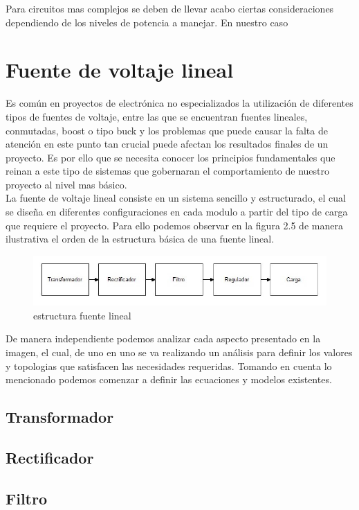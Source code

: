 Para circuitos mas complejos se deben de llevar acabo ciertas consideraciones dependiendo de los niveles de potencia a manejar. En nuestro caso 


\newpage
\section{Fuente de voltaje lineal}
Es común en proyectos de electrónica no especializados la utilización de diferentes tipos de fuentes de voltaje, entre las que se encuentran fuentes lineales, conmutadas, boost o tipo buck y los problemas que puede causar la falta de atención en este punto tan crucial puede afectan los resultados finales de un proyecto. Es por ello que se necesita conocer los principios fundamentales que reinan a este tipo de sistemas que gobernaran el comportamiento de nuestro proyecto al nivel mas básico.\\

La fuente de voltaje lineal consiste en un sistema sencillo y estructurado, el cual se diseña en diferentes configuraciones en cada modulo a partir del tipo de carga que requiere el proyecto. Para ello podemos observar en la figura 2.5 de manera ilustrativa el orden de la estructura básica de una fuente lineal.

\begin{figure}[H]
 \centering
 \includegraphics[width=12cm]{capitulo2/figs/fuentelineal.jpg}
 \caption{estructura fuente lineal}
 \end{figure}
 
 De manera independiente podemos analizar cada aspecto presentado en la imagen, el cual, de uno en uno se va realizando un análisis para definir los valores y topologias que satisfacen las necesidades requeridas. Tomando en cuenta lo mencionado podemos comenzar a definir las ecuaciones y modelos existentes.
\subsection{Transformador}
\subsection{Rectificador}

\subsection{Filtro}

